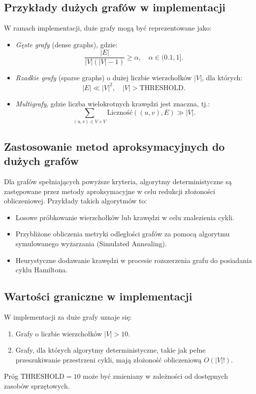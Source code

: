 \subsection{Przykłady dużych grafów w implementacji}

W ramach implementacji, duże grafy mogą być reprezentowane jako:
\begin{itemize}
    \item \emph{Gęste grafy} (dense graphs), gdzie:
    \[
    \frac{|E|}{|V|(|V|-1)} \geq \alpha, \quad \alpha \in (0.1, 1].
    \]
    \item \emph{Rzadkie grafy} (sparse graphs) o dużej liczbie wierzchołków \( |V| \), dla których:
    \[
    |E| \ll |V|^2, \quad |V| > \text{THRESHOLD}.
    \]
    \item \emph{Multigrafy}, gdzie liczba wielokrotnych krawędzi jest znaczna, tj.:
    \[
    \sum_{(u, v) \in V \times V} \text{Liczność}((u, v), E) \gg |V|.
    \]
\end{itemize}

\subsection{Zastosowanie metod aproksymacyjnych do dużych grafów}

Dla grafów spełniających powyższe kryteria, algorytmy deterministyczne są zastępowane przez metody aproksymacyjne w celu redukcji złożoności obliczeniowej. Przykłady takich algorytmów to:
\begin{itemize}
    \item Losowe próbkowanie wierzchołków lub krawędzi w celu znalezienia cykli.
    \item Przybliżone obliczenia metryki odległości grafów za pomocą algorytmu symulowanego wyżarzania (Simulated Annealing).
    \item Heurystyczne dodawanie krawędzi w procesie rozszerzenia grafu do posiadania cyklu Hamiltona.
\end{itemize}

\subsection{Wartości graniczne w implementacji}

W implementacji za duże grafy uznaje się:
\begin{enumerate}
    \item Grafy o liczbie wierzchołków \( |V| > 10 \).
    \item Grafy, dla których algorytmy deterministyczne, takie jak pełne przeszukiwanie przestrzeni cykli, mają złożoność obliczeniową \( O(|V|!) \).
\end{enumerate}
Próg \( \text{THRESHOLD} = 10 \) może być zmieniany w zależności od dostępnych zasobów sprzętowych.


